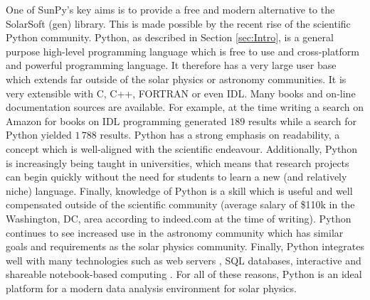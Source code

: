 One of SunPy's key aims is to provide a free and modern alternative to the 
SolarSoft (gen) library. This is made possible by the recent rise of the 
scientific Python community. Python, as described in Section \ref{sec:Intro}, 
is a general purpose high-level programming language which is free to use and 
cross-platform and powerful programming language.
It therefore has a very large user base which extends far outside of the 
solar physics or astronomy communities. It is very extensible with C, C++, 
FORTRAN or even IDL. Many books and on-line documentation sources are available. For 
example, at the time writing a search 
%
% 
on Amazon for books on IDL programming generated $189$ results while a search 
for Python yielded $1\,788$ results. Python has a strong emphasis on 
readability, a concept which is well-aligned with the scientific endeavour.
Additionally, Python is increasingly being taught in universities, which means 
that research projects can begin quickly without the need for students to learn 
a new (and relatively niche) language. Finally, knowledge of Python is a skill 
which is useful and well compensated outside of the scientific community 
(average salary of \$110k in the Washington, DC, area according to indeed.com at 
the time of writing). Python continues to see increased use in the astronomy 
community \citep{greenfield2011} which has similar goals and requirements as 
the solar physics community. Finally, Python integrates well with many 
technologies such as web servers \citep{dolgert2008}, SQL databases, 
interactive and shareable notebook-based computing \citep{perez2007}. For all 
of these reasons, Python is an ideal platform for a modern data analysis environment 
for solar physics.

